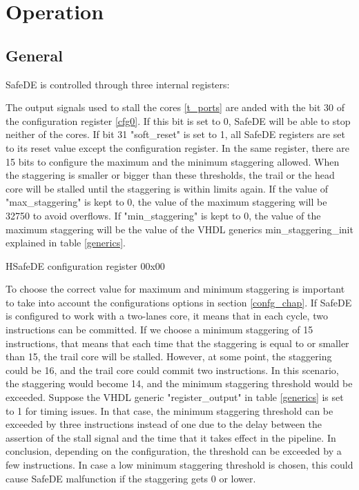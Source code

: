 \newpage
\section{Operation}
\label{operation_chap}
\subsection{General}
SafeDE is controlled through three internal registers:

The output signals used to stall the cores \ref{t_ports} are anded with the bit 30 of the configuration register \ref{cfg0}. If this bit is set to 0, SafeDE will be able to stop neither of the cores. If bit 31 "soft\_reset" is set to 1, all SafeDE registers are set to its reset value except the configuration register. In the same register, there are 15 bits to configure the maximum and the minimum staggering allowed. When the staggering is smaller or bigger than these thresholds, the trail or the head core will be stalled until the staggering is within limits again. If the value of "max\_staggering" is kept to 0, the value of the maximum staggering will be 32750 to avoid overflows. If "min\_staggering" is kept to 0, the value of the maximum staggering will be the value of the VHDL generics min\_staggering\_init explained in table \ref{generics}.

\begin{register}{H}{SafeDE configuration register 0}{0x00}
	\label{cfg0}
	\regnewline
\end{register}

To choose the correct value for maximum and minimum staggering is important to take into account the configurations options in section \ref{confg_chap}. If SafeDE is configured to work with a two-lanes core, it means that in each cycle, two instructions can be committed. If we choose a minimum staggering of 15 instructions, that means that each time that the staggering is equal to or smaller than 15, the trail core will be stalled. However, at some point, the staggering could be 16, and the trail core could commit two instructions. In this scenario, the staggering would become 14, and the minimum staggering threshold would be exceeded. Suppose the VHDL generic "register\_output" in table \ref{generics} is set to 1 for timing issues. In that case, the minimum staggering threshold can be exceeded by three instructions instead of one due to the delay between the assertion of the stall signal and the time that it takes effect in the pipeline. In conclusion, depending on the configuration, the threshold can be exceeded by a few instructions. In case a low minimum staggering threshold is chosen, this could cause SafeDE malfunction if the staggering gets 0 or lower.

